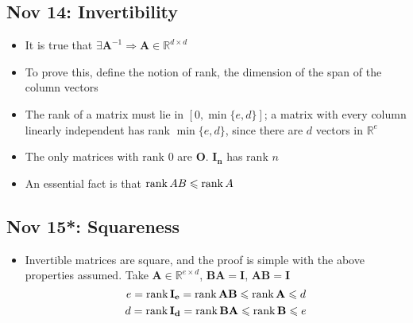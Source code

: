 \documentclass[10pt, oneside]{article}
\let\leq\leqslant
\newcommand{\R}{\mathbb{R}}
\newcommand{\mat}[1]{\mathbf{#1}}
\begin{document}
\subsection{Nov 14: Invertibility}
\begin{itemize}
    \item It is true that $\exists \mat{A}^{-1} \Rightarrow \mat{A} \in \R^{d \times d}$
    \item To prove this, define the notion of rank, the dimension of the span of the column vectors
    \item The rank of a matrix must lie in $[0,\min \{e,d\}]$; a matrix with every column linearly independent has rank $\min \{e,d\}$, since there are $d$ vectors in $\R^e$
    \item The only matrices with rank $0$ are $\mat{O}$. $\mat{I_n}$ has rank $n$
    \item An essential fact is that ${\rm rank} \, AB \leq {\rm rank} \, A$
\end{itemize}

\subsection{Nov 15*: Squareness}
\begin{itemize}
    \item Invertible matrices are square, and the proof is simple with the above properties assumed. Take $\mat{A} \in \R^{e\times d}$, $\mat{BA} = \mat{I}$, $\mat{AB} = \mat{I}$
        \[e = {\rm rank}\, \mat{I_e} = {\rm rank}\, \mat{AB} \leq {\rm rank}\, \mat{A} \leq d\]
        \[d = {\rm rank}\, \mat{I_d} = {\rm rank}\, \mat{BA} \leq {\rm rank}\, \mat{B} \leq e\]
\end{itemize}
\end{document}
